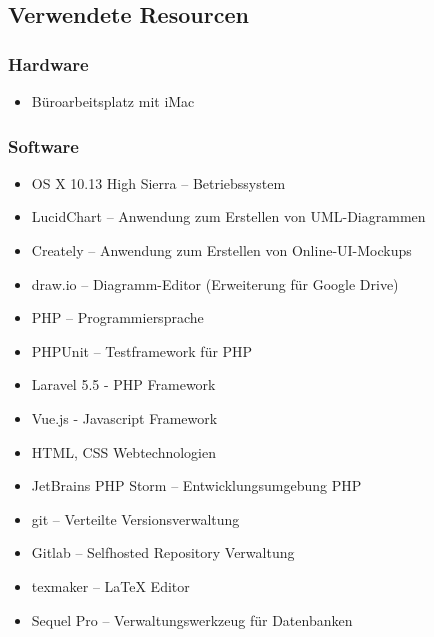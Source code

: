 \subsection{Verwendete Resourcen}
\label{app:Ressourcen}

\subsubsection{Hardware}

\begin{itemize}
	\item Büroarbeitsplatz mit iMac
\end{itemize}

\subsubsection{Software}

\begin{itemize}
	\item OS X 10.13 High Sierra – Betriebssystem
	\item LucidChart – Anwendung zum Erstellen von \acs{UML}-Diagrammen
	\item Creately – Anwendung zum Erstellen von Online-UI-Mockups
	\item draw.io – Diagramm-Editor (Erweiterung für Google Drive)
	\item PHP – Programmiersprache
	\item PHPUnit – Testframework für PHP
	\item Laravel 5.5 - \acs{PHP} Framework
	\item Vue.js - Javascript Framework
	\item \acs{HTML}, \acs{CSS} Webtechnologien
	\item JetBrains PHP Storm – Entwicklungsumgebung \acs{PHP}
	\item git – Verteilte Versionsverwaltung
	\item Gitlab – Selfhosted Repository Verwaltung
	\item texmaker – \LaTeX\xspace Editor
	\item Sequel Pro – Verwaltungswerkzeug für Datenbanken
\end{itemize}